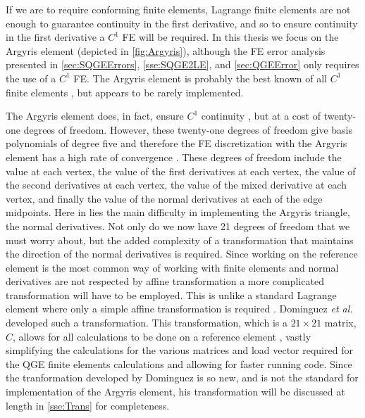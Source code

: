 If we are to require conforming finite elements, Lagrange finite elements are
not enough to guarantee continuity in the first derivative, and so to ensure
continuity in the first derivative \cite{Johnson} a $C^1$ FE will be required.
In this thesis we focus on the Argyris element (depicted in
\autoref{fig:Argyris}), although the FE error analysis presented in
\autoref{sec:SQGEErrors}, \autoref{sse:SQGE2LE}, and \autoref{sec:QGEError} only
requires the use of a $C^1$ FE. The Argyris element is probably the best known
of all $C^1$ finite elements \cite{Argyris,Dominguez08}, but appears to be rarely
implemented.



The Argyris element does, in fact, ensure $C^1$ continuity
\cite{Dominguez08,Okabe}, but at a cost of twenty-one degrees of freedom.
However, these twenty-one degrees of freedom give basis polynomials of degree
five and therefore the FE discretization with the Argyris element has a high
rate of convergence \cite{Dominguez08}.  These degrees of freedom include the
value at each vertex, the value of the first derivatives at each vertex, the
value of the second derivatives at each vertex, the value of the mixed
derivative at each vertex, and finally the value of the normal derivatives at
each of the edge midpoints. Here in lies the main difficulty in implementing the
Argyris triangle, the normal derivatives. Not only do we now have 21 degrees of
freedom that we must worry about, but the added complexity of a transformation
that maintains the direction of the normal derivatives is required. Since
working on the reference element is the most common way of working with finite
elements and normal derivatives are not respected by affine transformation a
more complicated transformation will have to be employed. This is unlike a
standard Lagrange element where only a simple affine transformation is required
\cite{Dominguez08}.  Dominguez \emph{et al.} developed such a transformation.
This transformation, which is a $21 \times 21$ matrix, $C$, allows for all
calculations to be done on a reference element \cite{Dominguez08}, vastly
simplifying the calculations for the various matrices and load vector required
for the QGE finite elements calculations and allowing for faster running code.
Since the tranformation developed by Dominguez is so new, and is not the
standard for implementation of the Argyris element, his transformation will be
discussed at length in \autoref{sse:Trans} for completeness.
